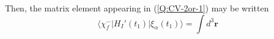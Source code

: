 Then, the matrix element appearing in (\ref{Q:CV-2or-1}) may be written
\begin{equation} \label{Q:Tif-2CV2-1}
  \big\langle \chi_{f}^{-} \big| H_{I}'(t_{1}) \big|\xi_{\alpha}(t_{1})\big\rangle = \int d^{3} \bm{r} \; 
\end{equation}






